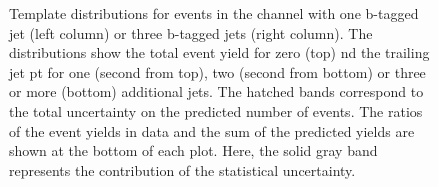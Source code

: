 \begin{figure}[htbp!]
\begin{center}
\caption{Template distributions for events in the \mumu channel with one b-tagged jet (left column) or three b-tagged jets (right column). The distributions show the total event yield for zero (top) nd the trailing jet pt for one (second from top),
  two (second from bottom) or three or more (bottom) additional jets. 
  The hatched bands correspond to the total uncertainty on the predicted number of events. The ratios of the event yields in data and the sum of the
  predicted yields are shown at the bottom of each plot. Here, the solid
  gray band represents the contribution of the statistical uncertainty.  
       \label{fig:xsec_mumu_inputdistr}}
  \end{center}
\end{figure}

